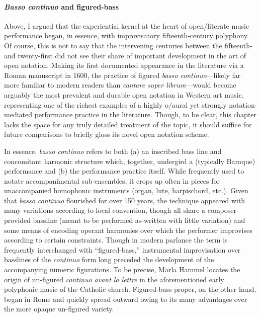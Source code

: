     \paragraph{\textit{Basso continuo} and figured-bass} Above, I argued that the experiential kernel at the heart of open/literate music performance began, in essence, with improvisatory fifteenth-century polyphony. Of course, this is not to say that the intervening centuries between the fifteenth- and twenty-first did not see their share of important development in the art of open notation. Making its first documented appearance in the literature via a Roman manuscript in 1600, the practice of figured \textit{basso continuo}---likely far more familiar to modern readers than \textit{cantare super librum}---would become arguably the most prevalent and durable open notation in Western art music, representing one of the richest examples of a highly o/aural yet strongly notation-mediated performance practice in the literature.\autocite[811]{Taruskin_2009} Though, to be clear, this chapter lacks the space for any truly detailed treatment of the topic, it should suffice for future comparisons to briefly gloss its novel open notation scheme.

    In essence, \textit{basso continuo} refers to both (a) an inscribed bass line and concomitant harmonic structure which, together, undergird a (typically Baroque) performance and (b) the performance practice itself. While frequently used to notate accompanimental sub-ensembles, it crops up often in pieces for unaccompanied homophonic instruments (organ, lute, harpischord, etc.). Given that \textit{basso continuo} flourished for over 150 years, the technique appeared with many variations according to local convention, though all share a composer-provided bassline (meant to be performed as-written with little variation) and some means of encoding operant harmonies over which the performer improvises according to certain constraints. Though in modern parlance the term is frequently interchanged with ``figured-bass,'' instrumental improvisation over basslines of the \textit{continuo} form long preceded the development of the accompanying numeric figurations. To be precise, Marla Hammel locates the origin of un-figured \textit{continuo} \textit{avant la lettre} in the aforementioned early polyphonic music of the Catholic church. Figured-bass proper, on the other hand, began in Rome and quickly spread outward owing to its many advantages over the more opaque un-figured variety.\autocite[28--9]{Hammel_1977}

